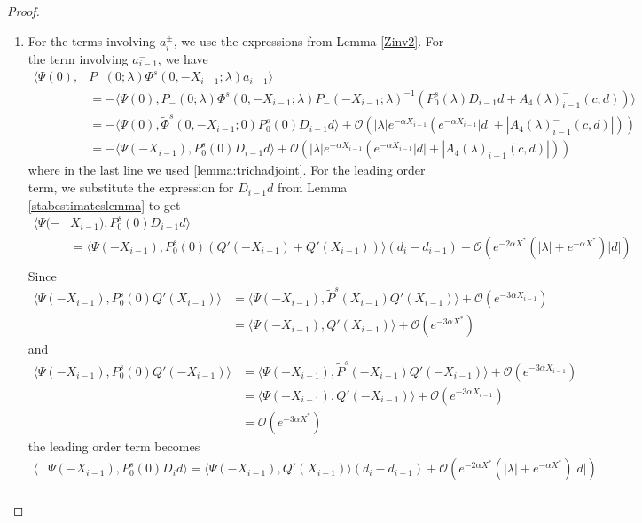 \documentclass[thesis.tex]{subfiles}
\begin{document}
\begin{lemma}
\begin{proof}
\begin{enumerate}
\item For the terms involving $a_i^\pm$, we use the expressions from Lemma \ref{Zinv2}. For the term involving $a_{i-1}^-$, we have
\begin{align*}
\langle \Psi(0), &P_-(0; \lambda) \Phi^s(0, -X_{i-1}; \lambda) a_{i-1}^- \rangle \\
&= -\langle \Psi(0), P_-(0; \lambda) \Phi^s(0, -X_{i-1}; \lambda) P_-(-X_{i-1}; \lambda)^{-1} \left( P_0^s(\lambda) D_{i-1} d + A_4(\lambda)_{i-1}^-(c, d) \right) \rangle \\
&= -\langle \Psi(0), \tilde{\Phi}^s(0, -X_{i-1}; 0)P_0^s(0) D_{i-1} d \rangle 
+\mathcal{O}\left( |\lambda|e^{-\alpha X_{i-1}}(e^{-\alpha X_{i-1}}|d| + |A_4(\lambda)_{i-1}^-(c, d)|) \right) \\
&= -\langle \Psi(-X_{i-1}), P_0^s(0) D_{i-1} d \rangle +\mathcal{O}\left( |\lambda|e^{-\alpha X_{i-1}}(e^{-\alpha X_{i-1}}|d| + |A_4(\lambda)_{i-1}^-(c, d)|) \right)
\end{align*}
where in the last line we used \cref{lemma:trichadjoint}. For the leading order term, we substitute the expression for $D_{i-1}d$ from Lemma \ref{stabestimateslemma} to get 
\begin{align*}
\langle \Psi(-&X_{i-1}), P_0^s(0) D_{i-1} d \rangle \\
&= \langle \Psi(-X_{i-1}), P_0^s(0)( Q'(-X_{i-1}) + Q'(X_{i-1})) \rangle (d_i - d_{i-1} ) + \mathcal{O}(e^{-2 \alpha X^*}(|\lambda| + e^{-\alpha X^*})|d|) \\
\end{align*}
Since
\begin{align*}
\langle \Psi(-X_{i-1}), P_0^s(0) Q'(X_{i-1})\rangle
&= \langle \Psi(-X_{i-1}), \tilde{P}^s(X_{i-1}) Q'(X_{i-1})\rangle + \mathcal{O}(e^{-3 \alpha X_{i-1}}) \\
&= \langle \Psi(-X_{i-1}), Q'(X_{i-1})\rangle + \mathcal{O}(e^{-3\alpha X^*})
\end{align*}
and
\begin{align*}
\langle \Psi(-X_{i-1}), P_0^s(0) Q'(-X_{i-1})\rangle
&= \langle \Psi(-X_{i-1}), \tilde{P}^s(-X_{i-1}) Q'(-X_{i-1})\rangle + \mathcal{O}(e^{-3 \alpha X_{i-1}}) \\
&= \langle \Psi(-X_{i-1}), Q'(-X_{i-1})\rangle + \mathcal{O}(e^{-3 \alpha X_{i-1}}) \\
&= \mathcal{O}(e^{-3 \alpha X^*})
\end{align*}
the leading order term becomes
\begin{align*}
\langle &\Psi(-X_{i-1}), P_0^s(0) D_i d \rangle = \langle \Psi(-X_{i-1}), Q'(X_{i-1}) \rangle (d_i - d_{i-1} ) + \mathcal{O}(e^{-2 \alpha X^*}(|\lambda| + e^{-\alpha X^*})|d|) \\

\end{align*}
\end{enumerate}
\end{proof}
\end{lemma}
\end{document}
